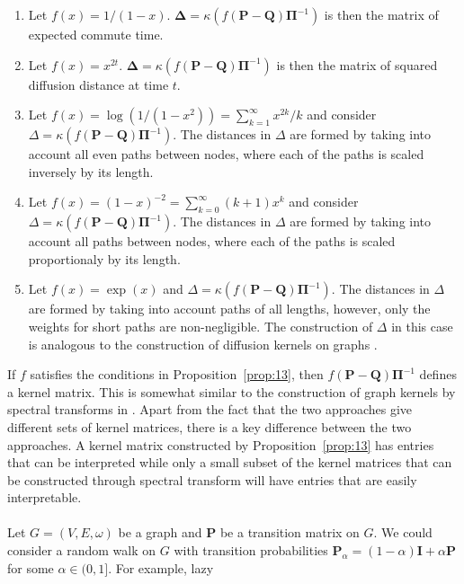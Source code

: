 \begin{enumerate}
\item Let $f(x) = 1/(1-x)$. $\bm{\Delta} = \kappa(f(\mathbf{P} -
  \mathbf{Q})\bm{\Pi}^{-1})$ is then the matrix of expected commute time.
\item Let $f(x) = x^{2t}$. $\bm{\Delta} = \kappa(f(\mathbf{P} -
  \mathbf{Q})\bm{\Pi}^{-1})$ is then the matrix of squared diffusion distance at
  time $t$. 
\item Let $f(x) = \log(1/(1-x^2)) = \sum_{k=1}^{\infty}{x^{2k}/k}$ and
  consider $\Delta = \kappa(f(\mathbf{P} -
  \mathbf{Q})\bm{\Pi}^{-1})$. The distances in $\Delta$ are formed by
  taking into account all even paths between nodes, where each of the
  paths is scaled inversely by its length.
\item Let $f(x) = (1-x)^{-2} = \sum_{k=0}^{\infty}{(k+1)x^k}$ and
  consider $\Delta = \kappa(f(\mathbf{P} -
  \mathbf{Q})\bm{\Pi}^{-1})$. The distances in $\Delta$ are formed by
  taking into account all paths between nodes, where each of the paths
  is scaled proportionaly by its length.
\item Let $f(x) = \exp(x)$ and $\Delta = \kappa(f(\mathbf{P}
  - \mathbf{Q})\bm{\Pi}^{-1})$. The distances in $\Delta$ are formed by
  taking into account paths of all lengths, however, only the weights for
  short paths are non-negligible. The construction of $\Delta$ in this
  case is analogous to the construction of diffusion
  kernels on graphs \cite{kondor02:_diffus}. 
\end{enumerate}
%
%
If $f$ satisfies the conditions in Proposition~\ref{prop:13}, then
$f(\mathbf{P} - \mathbf{Q})\bm{\Pi}^{-1}$ defines a kernel
matrix. This is somewhat similar to the construction of graph kernels
by spectral transforms in
\citet{zhu05:_semi,chapelle03:_clust_kernel_semi_super_learn,smola03:_kernel}.
Apart from the fact that the two approaches give different sets of
kernel matrices, there is a key difference between the two
approaches. A kernel matrix constructed by Proposition~\ref{prop:13}
has entries that can be interpreted while only a small subset of the
kernel matrices that can be constructed through spectral transform will
have entries that are easily interpretable. \\ \\
\noindent
Let $G = (V,E,\omega)$ be a graph and $\mathbf{P}$ be a transition
matrix on $G$. We could consider a random walk on $G$ with transition
probabilities $\mathbf{P}_{\alpha} = (1 - \alpha)\mathbf{I} +
\alpha \mathbf{P}$ for some $\alpha \in (0,1]$. For example, lazy
